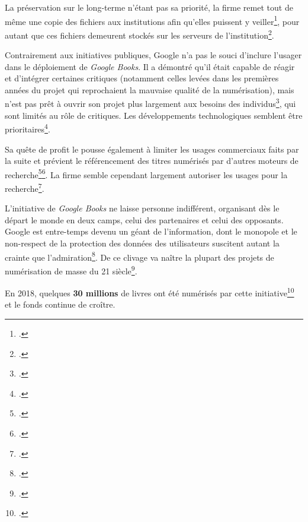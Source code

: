 La préservation sur le long-terme n'étant pas sa priorité, la firme remet tout de même une copie des fichiers aux institutions afin qu'elles puissent y veiller\footcite{leetaru_mass_2008}, pour autant que ces fichiers demeurent stockés sur les serveurs de l'institution\footcite{association_pour_le_patrimoine_naturel_et_culturel_du_canton_de_vaud_patrimoine_2012}. 

Contrairement aux initiatives publiques, Google n'a pas le souci d'inclure l'usager dans le déploiement de \textit{Google Books}. Il a démontré qu'il était capable de réagir et d'intégrer certaines critiques (notamment celles levées dans les premières années du projet qui reprochaient la mauvaise qualité de la numérisation), mais n'est pas prêt à ouvrir son projet plus largement aux besoins des individus\footcite{jones_public_2017}, qui sont limités au rôle de critiques. Les développements technologiques semblent être prioritaires\footcite{hoffmann_google_2016}. 

Sa quête de profit le pousse également à limiter les usages commerciaux faits par la suite et prévient le référencement des titres numérisés par d'autres moteurs de recherche\footcite{clavert_histoire_2013}\footcite{moatti_bibliotheque_2012}. La firme semble cependant largement autoriser les usages pour la recherche\footcite{leetaru_mass_2008}. 

L'initiative de \textit{Google Books} ne laisse personne indifférent, organisant dès le départ le monde en deux camps, celui des partenaires et celui des opposants. Google est entre-temps devenu un géant de l'information, dont le monopole et le non-respect de la protection des données des utilisateurs suscitent autant la crainte que l'admiration\footcite{clavert_histoire_2013}. De ce clivage va naître la plupart des projets de numérisation de masse du 21 siècle\footcite{thylstrup_politics_2018}. 

En 2018, quelques \textbf{30 millions} de livres ont été numérisés par cette initiative\footcite{thylstrup_politics_2018} et le fonds continue de croître. 

\newpage

